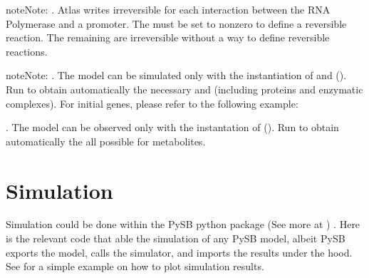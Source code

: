 \documentclass[letterpaper,10pt,english]{sphinxmanual}
\begin{document}
\begin{sphinxadmonition}{note}{Note:}
. Atlas writes irreversible  for each
interaction between the RNA Polymerase and a promoter. The 
must be set to non\sphinxhyphen{}zero to define a reversible reaction. The remaining 
are irreversible without a way to define reversible reactions.
\end{sphinxadmonition}

\begin{sphinxadmonition}{note}{Note:}
. The model can be simulated only with the instantiation of
 and  ().
Run  to obtain
automatically the necessary  and  (including
proteins and enzymatic complexes). For initial genes, please refer to the
following example:

. The model can be observed only with the instantation of
 ().
Run  to obtain
automatically the all possible  for metabolites.
\end{sphinxadmonition}


\chapter{Simulation}
\label{\detokenize{Simulation:simulation}}\label{\detokenize{Simulation:simulation-page}}\label{\detokenize{Simulation::doc}}
Simulation could be done within the PySB python package (See more at )
. Here is the relevant code that able the simulation of any PySB model, albeit
PySB exports the model, calls the simulator, and imports the results under the
hood. See {\hyperref[\detokenize{Plotting:plotting-page}]{}} for a simple example on how to plot simulation results.
\end{document}
